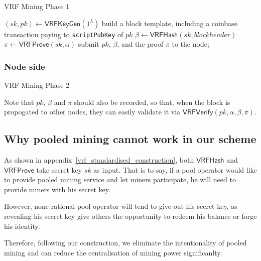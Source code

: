 \begin{algorithm}[H]
\caption{VRF Mining Phase 1}
\label{algo:vft-mining-1}
\SetAlgoLined
  $(sk, pk) \gets \mathsf{VRFKeyGen}(1^{\lambda})$\;
  build a block template, including a coinbase transaction paying to \texttt{scriptPubKey} of $pk$\;
  $\beta \gets \mathsf{VRFHash}(sk, blockheader)$\;
  $\pi \gets \mathsf{VRFProve}(sk, \alpha)$\;
  submit $pk$, $\beta$, and the proof $\pi$ to the node;
\end{algorithm}

\subsubsection{Node side}

\begin{algorithm}[H]
\caption{VRF Mining Phase 2}
\label{algo:vft-mining-2}
\SetAlgoLined
{}
\end{algorithm}

Note that $pk$, $\beta$ and $\pi$ should also be recorded, so that, when the block is propogated to other nodes, they can easily validate it via $\mathsf{VRFVerify}(pk, \alpha, \beta, \pi)$.



\subsection{Why pooled mining cannot work in our scheme}
\label{sec:discourage-pool}

As shown in appendix~\ref{vrf_standardised_construction}, both $\mathsf{VRFHash}$ and $\mathsf{VRFProve}$ take secret key $sk$ as input.
That is to say, if a pool operator would like to provide pooled mining service and let miners participate, he will need to provide miners with his secret key.

However, none rational pool operator will tend to give out his secret key, as revealing his secret key give others the opportunity to redeem his balance or forge his identity.

Therefore, following our construction, we eliminate the intentionality of pooled mining and can reduce the centralisation of mining power significanlty.
